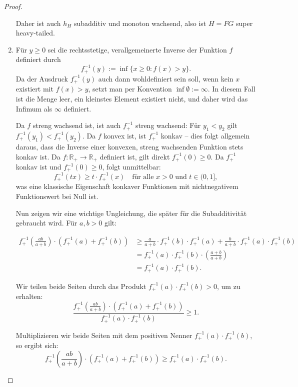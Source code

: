 \documentclass[
12pt,
fancyheadings, %
%
a4paper, 
%
]{tuhhreprt}
\begin{document}
\begin{proof}
\begin{enumerate}[label=\roman*)]
    Daher ist auch \( h_H \) subadditiv und monoton wachsend, also ist \( H = FG \) super heavy-tailed.

    \item Für \( y \geq 0 \) sei die rechtsstetige, verallgemeinerte Inverse der Funktion \( f \) definiert durch
    \[
    f^{-1}_+(y) := \inf \{ x \geq 0 : f(x) > y \}.
    \]
    Da der Ausdruck \( f^{-1}_+(y) \) auch dann wohldefiniert sein soll, wenn kein \( x \) existiert mit \( f(x) > y \), setzt man per Konvention \( \inf \emptyset := \infty \). In diesem Fall ist die Menge leer, ein kleinstes Element existiert nicht, und daher wird das Infimum als \( \infty \) definiert.

    Da \( f \) streng wachsend ist, ist auch \( f^{-1}_+ \) streng wachsend: Für \( y_1 < y_2 \) gilt \( f^{-1}_+(y_1) < f^{-1}_+(y_2) \).  
    Da \( f \) konvex ist, ist \( f^{-1}_+ \) konkav – dies folgt allgemein daraus, dass die Inverse einer konvexen, streng wachsenden Funktion stets konkav ist.  
    Da \( f : \mathbb{R}_+ \to \mathbb{R}_+ \) definiert ist, gilt direkt \( f^{-1}_+(0) \geq 0 \).  
    Da \( f_+^{-1} \) konkav ist und \( f_+^{-1}(0) \geq 0 \), folgt unmittelbar:
    \[
    f_+^{-1}(t x) \geq t \cdot f_+^{-1}(x)
    \quad \text{für alle } x > 0 \text{ und } t \in (0, 1],
    \]
    was eine klassische Eigenschaft konkaver Funktionen mit nichtnegativem Funktionswert bei Null ist.

    \medskip

    Nun zeigen wir eine wichtige Ungleichung, die später für die Subadditivität gebraucht wird. Für \( a, b > 0 \) gilt:

    \begin{align*}
    f_+^{-1}\left( \frac{ab}{a + b} \right) \cdot (f_+^{-1}(a) + f_+^{-1}(b))
    &\geq \frac{a}{a + b} \cdot f_+^{-1}(b) \cdot f_+^{-1}(a) + \frac{b}{a + b} \cdot f_+^{-1}(a) \cdot f_+^{-1}(b) \\
    &= f_+^{-1}(a) \cdot f_+^{-1}(b) \cdot \left( \frac{a + b}{a + b} \right) \\
    &= f_+^{-1}(a) \cdot f_+^{-1}(b).
    \end{align*}

    Wir teilen beide Seiten durch das Produkt \( f_+^{-1}(a) \cdot f_+^{-1}(b) > 0 \), um zu erhalten:
    \[
    \frac{f_+^{-1}\left( \frac{ab}{a + b} \right) \cdot (f_+^{-1}(a) + f_+^{-1}(b))}{f_+^{-1}(a) \cdot f_+^{-1}(b)} \geq 1.
    \]

    Multiplizieren wir beide Seiten mit dem positiven Nenner \( f_+^{-1}(a) \cdot f_+^{-1}(b) \), so ergibt sich:
    \[
    f_+^{-1}\left( \frac{ab}{a + b} \right) \cdot \left( f_+^{-1}(a) + f_+^{-1}(b) \right) \geq f_+^{-1}(a) \cdot f_+^{-1}(b).
    \]


\end{enumerate}
\end{proof}
\end{document}
